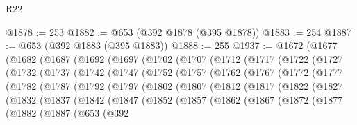 \begin{lexlean}{R22}
\begin{coremodule}
@1878 := 253
@1882 := @653 (@392 @1878 (@395 @1878))
@1883 := 254
@1887 := @653 (@392 @1883 (@395 @1883))
@1888 := 255
@1937 := @1672
    (@1677
      (@1682
        (@1687
          (@1692
            (@1697
              (@1702
                (@1707
                  (@1712
                    (@1717
                      (@1722
                        (@1727
                          (@1732
                            (@1737
                              (@1742
                                (@1747
                                  (@1752
                                    (@1757
                                      (@1762
                                        (@1767
                                          (@1772
                                            (@1777
                                              (@1782
                                                (@1787
                                                  (@1792
                                                    (@1797
                                                      (@1802
                                                        (@1807
                                                          (@1812
                                                            (@1817
                                                              (@1822
                                                                (@1827
                                                                  (@1832
                                                                    (@1837
                                                                      (@1842
                                                                        (@1847
                                                                          (@1852
                                                                            (@1857
                                                                              (@1862
                                                                                (@1867
                                                                                  (@1872
                                                                                    (@1877
                                                                                      (@1882
                                                                                        (@1887
                                                                                          (@653
                                                                                            (@392

\end{coremodule}
\end{lexlean}
